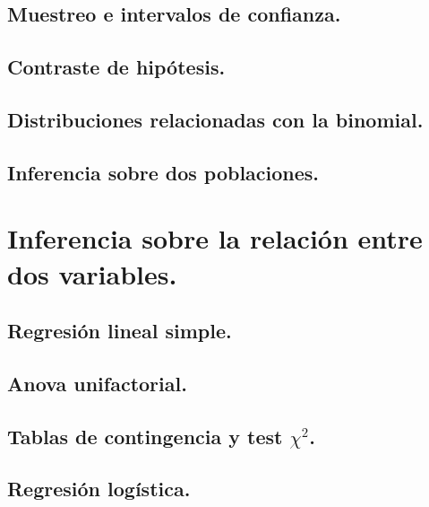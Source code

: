 \documentclass[10pt,a4paper]{book}
\begin{document}
\chapter{Muestreo e intervalos de confianza.}
\label{cap:IntervalosConfianza}


\chapter{Contraste de hipótesis.}
\label{cap:ContrasteHipotesis}



\chapter{Distribuciones relacionadas con la binomial.}
\label{cap:DistribucionesRelacionadasBinomial}


\chapter{Inferencia sobre dos poblaciones.}
\label{cap:Inferencia2Poblaciones}



\part{Inferencia sobre la relación entre dos variables.}
\label{parte:InferenciaRelacion2Variables}


\chapter{Regresión lineal simple.}
\label{cap:RegresionLinealSimple}


\chapter{Anova unifactorial.}
\label{cap:IntroduccionAnova}


\chapter{Tablas de contingencia y test $\chi^2$.}
\label{cap:TablasContingenciaTestChi2}


\chapter{Regresión logística.}
\label{cap:RegresionLogistica}

\end{document}
